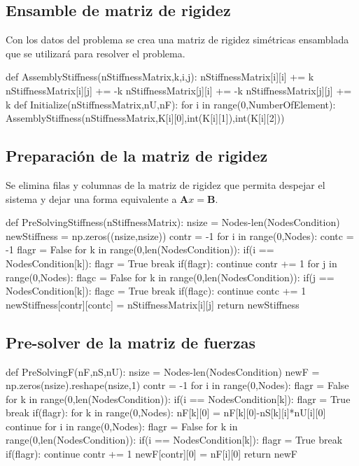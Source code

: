 \documentclass[12pt,a3paper]{article}
\begin{document}
\subsection{Ensamble de matriz de rigidez}
Con los datos del problema se crea una matriz de rigidez simétricas ensamblada que se utilizará para resolver el problema.
\begin{pyglist}[language=python,caption={Ensamble de matriz de rigidez},style=pastie]
def AssemblyStiffness(nStiffnessMatrix,k,i,j):
    nStiffnessMatrix[i][i] += k
    nStiffnessMatrix[i][j] += -k
    nStiffnessMatrix[j][i] += -k
    nStiffnessMatrix[j][j] += k
def Initialize(nStiffnessMatrix,nU,nF):
    for i in range(0,NumberOfElement):
        AssemblyStiffness(nStiffnessMatrix,K[i][0],int(K[i][1]),int(K[i][2]))
\end{pyglist}
\subsection{Preparación de la matriz de rigidez}
Se elimina filas y columnas de la matriz de rigidez que permita despejar el sistema y dejar una forma equivalente a $\mathbf{A}x = \mathbf{B}$.
\begin{pyglist}[language=python,caption={Preparación de matriz de rigidez},style=pastie]
def PreSolvingStiffness(nStiffnessMatrix):
    nsize = Nodes-len(NodesCondition)
    newStiffness = np.zeros((nsize,nsize))
    contr = -1
    for i in range(0,Nodes):
        contc = -1
        flagr = False
        for k in range(0,len(NodesCondition)):
            if(i == NodesCondition[k]):
                flagr = True
                break
        if(flagr):
            continue
        contr += 1
        for j in range(0,Nodes):
            flagc = False
            for k in range(0,len(NodesCondition)):
                if(j == NodesCondition[k]):
                    flagc = True
                    break
            if(flagc):
                continue
            contc += 1
            newStiffness[contr][contc] = nStiffnessMatrix[i][j]
    return newStiffness
\end{pyglist}
\subsection{Pre-solver de la matriz de fuerzas}
\begin{pyglist}[language=python,caption={Pre-solver de la matriz de fuerzas},style=pastie]
def PreSolvingF(nF,nS,nU):
    nsize = Nodes-len(NodesCondition)
    newF = np.zeros(nsize).reshape(nsize,1)
    contr = -1
    for i in range(0,Nodes):
        flagr = False
        for k in range(0,len(NodesCondition)):
            if(i == NodesCondition[k]):
                flagr = True
                break
        if(flagr):
            for k in range(0,Nodes):
                nF[k][0] = nF[k][0]-nS[k][i]*nU[i][0]
            continue
    for i in range(0,Nodes):
        flagr = False
        for k in range(0,len(NodesCondition)):
            if(i == NodesCondition[k]):
                flagr = True
                break
        if(flagr):
            continue
        contr += 1
        newF[contr][0] = nF[i][0]  
    return newF
\end{pyglist}
\end{document}
